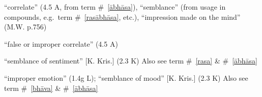\documentclass[10pt]{article}
\begin{document}
\begin{multicols}{2}
\begin{enumerate}
		 ``correlate'' (4.5 A, from term \#~\ref{ābhāsa}),
		``semblance'' (from usage in compounds, e.g.\ term \#~\ref{rasābhāsa}, etc.),
		``impression made on the mind'' (M.W. p.756)

		 ``false or improper correlate'' (4.5 A)

		 ``semblance of sentiment'' [K. Kris.] (2.3 K)
		Also see term \#~\ref{rasa} \& \#~\ref{ābhāsa}

		 ``improper emotion'' (1.4g L);
		``semblance of mood'' [K. Kris.] (2.3 K)
		Also see term \#~\ref{bhāva} \& \#~\ref{ābhāsa}


\end{enumerate}
\end{multicols}
\end{document}

